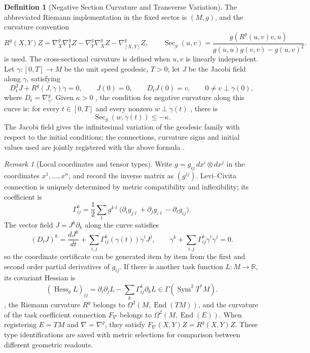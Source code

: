\documentclass[12pt,a4paper,openany,notitlepage]{report}
\theoremstyle{plain}
\theoremstyle{definition}
\newtheorem{definition}[theorem]{Definition}
\theoremstyle{remark}
\newtheorem{remark}[theorem]{Remark}
\begin{document}
\begin{CJK*}
\begin{definition}
[Negative Section Curvature and Transverse Variation]\label{hgov:geo:def:jacobi}
The abbreviated Riemann implementation in the fixed sector is $(M,g)$, and the curvature convention \[
R^g(X,Y)Z=
\nabla^g_X\nabla^g_YZ-
\nabla^g_Y\nabla^g_XZ-
\nabla^g_{[X,Y]}Z,
\qquad
\operatorname{Sec}_g(u,v)=
\frac{g(R^g(u,v)v,u)}{
g(u,u)g(v,v)-g(u,v)^2}.
\] is used. The cross-sectional curvature is defined when $u,v$ is linearly independent. Let $\gamma:[0,T]\to M$ be the unit speed geodesic, $T>0$; let $J$ be the Jacobi field along $\gamma$, satisfying \begin{equation}
\label{hgov:geo:eq:jacobi}
D_t^2J+R^g(J,\dot\gamma)\dot\gamma=0,
\qquad J(0)=0,\qquad D_tJ(0)=v,
\qquad 0\ne v\perp\dot\gamma(0),
\end{equation} where $D_t=\nabla^g_{\dot\gamma}$. Given $\kappa>0$ , the condition for negative curvature along this curve is: for every $t\in[0,T]$ and every nonzero $w\perp\dot\gamma(t)$ , there is \[
\operatorname{Sec}_g(w,\dot\gamma(t))\le-\kappa.
\] The Jacobi field gives the infinitesimal variation of the geodesic family with respect to the initial conditions; the connections, curvature signs and initial values used are jointly registered with the above formula \cite{ExtLeeRiemann}.\end{definition}


\begin{remark}
[Local coordinates and tensor types]Write $g=g_{ij}\,dx^i\otimes dx^j$ in the coordinates $x^1,\ldots,x^n$, and record the inverse matrix as $(g^{ij})$. Levi--Civita connection is uniquely determined by metric compatibility and inflexibility; its coefficient is \[
\Gamma^k_{ij}=\frac12\sum_\ell g^{k\ell}
\bigl(\partial_i g_{j\ell}+\partial_jg_{i\ell}-\partial_\ell g_{ij}\bigr).
\] The vector field $J=J^k\partial_k$ along the curve satisfies \[
(D_tJ)^k=\frac{dJ^k}{dt}
+\sum_{i,j}\Gamma^k_{ij}(\gamma(t))\dot\gamma^iJ^j,
\qquad
\ddot\gamma^k+\sum_{i,j}\Gamma^k_{ij}\dot\gamma^i\dot\gamma^j=0.
\] so the coordinate certificate can be generated item by item from the first and second order partial derivatives of $g_{ij}$. If there is another task function $L:M\to\mathbb R$, its covariant Hessian is \[
(\operatorname{Hess}_gL)_{ij}
=\partial_i\partial_jL-\sum_k\Gamma^k_{ij}\partial_kL
\in\Gamma(\operatorname{Sym}^2T^*M).
\], the Riemann curvature $R^g$ belongs to $\Omega^2(M,\operatorname{End}(TM))$, and the curvature of the task coefficient connection $F_\nabla$ belongs to $\Omega^2(M,\operatorname{End}(E))$. When registering $E=TM$ and $\nabla=\nabla^g$, they satisfy $F_\nabla(X,Y)Z=R^g(X,Y)Z$. These type identifications are saved with metric selections for comparison between different geometric readouts.\end{remark}



\end{CJK*}
\end{document}
